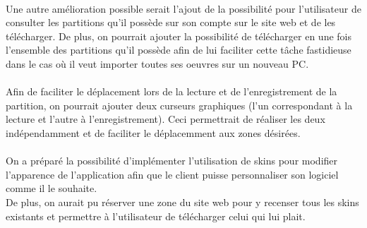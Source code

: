 \paragraph{}
Une autre amélioration possible serait l'ajout de la possibilité pour l'utilisateur de consulter les partitions qu'il possède sur son compte sur le site web et de les télécharger. 
De plus, on pourrait ajouter la possibilité de télécharger en une fois l'ensemble des partitions qu'il possède afin de lui faciliter cette tâche fastidieuse dans le cas où il veut importer toutes ses oeuvres sur un nouveau PC. 

\paragraph{}
Afin de faciliter le déplacement lors de la lecture et de l'enregistrement de la partition, on pourrait ajouter deux curseurs graphiques (l'un correspondant à la lecture et l'autre à l'enregistrement).
Ceci permettrait de réaliser les deux indépendamment et de faciliter le déplacemment aux zones désirées.

\paragraph{}
On a préparé la possibilité d'implémenter l'utilisation de skins pour modifier l'apparence de l'application afin que le client puisse personnaliser son logiciel comme il le souhaite. \\
De plus, on aurait pu réserver une zone du site web pour y recenser tous les skins existants et permettre à l'utilisateur de télécharger celui qui lui plait. 
